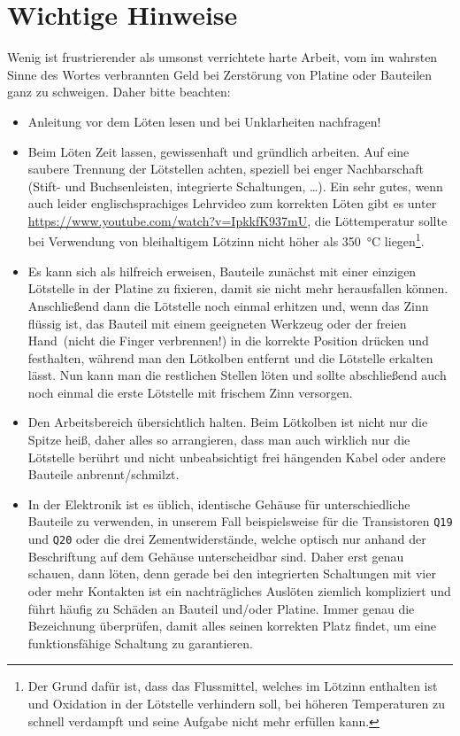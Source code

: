 \documentclass[paper=a4, open=any, numbers=noenddot]{scrbook}
\begin{document}
		\section{Wichtige Hinweise}
			Wenig ist frustrierender als umsonst verrichtete harte Arbeit, vom im wahrsten Sinne des Wortes verbrannten Geld bei Zerstörung von Platine oder Bauteilen ganz zu schweigen. Daher bitte beachten:
			\begin{itemize}
				\item
				      Anleitung vor dem Löten lesen und bei Unklarheiten nachfragen!
				\item
				      Beim Löten Zeit lassen, gewissenhaft und gründlich arbeiten. Auf eine saubere Trennung der Lötstellen achten, speziell bei enger Nachbarschaft (Stift- und Buchsenleisten, integrierte Schaltungen, \dots). Ein sehr gutes, wenn auch leider englischsprachiges Lehrvideo zum korrekten Löten gibt es unter \url{https://www.youtube.com/watch?v=IpkkfK937mU}, die Löttemperatur sollte bei Verwendung von bleihaltigem Lötzinn nicht höher als \SI{350}{\degreeCelsius} liegen\footnote{Der Grund dafür ist, dass das Flussmittel, welches im Lötzinn enthalten ist und Oxidation in der Lötstelle verhindern soll, bei höheren Temperaturen zu schnell verdampft und seine Aufgabe nicht mehr erfüllen kann.}.
				\item
				      Es kann sich als hilfreich erweisen, Bauteile zunächst mit einer einzigen Lötstelle in der Platine zu fixieren, damit sie nicht mehr herausfallen können. Anschließend dann die Lötstelle noch einmal erhitzen und, wenn das Zinn flüssig ist, das Bauteil mit einem geeigneten Werkzeug oder der freien Hand~(nicht die Finger verbrennen!) in die korrekte Position drücken und festhalten, während man den Lötkolben entfernt und die Lötstelle erkalten lässt. Nun kann man die restlichen Stellen löten und sollte abschließend auch noch einmal die erste Lötstelle mit frischem Zinn versorgen.
				\item
				      Den Arbeitsbereich übersichtlich halten. Beim Lötkolben ist nicht nur die Spitze heiß, daher alles so arrangieren, dass man auch wirklich nur die Lötstelle berührt und nicht unbeabsichtigt frei hängenden Kabel oder andere Bauteile anbrennt/schmilzt.
				\item
				      In der Elektronik ist es üblich, identische Gehäuse für unterschiedliche Bauteile zu verwenden, in unserem Fall beispielsweise für die Transistoren \texttt{Q19} und \texttt{Q20} oder die drei Zementwiderstände, welche optisch nur anhand der Beschriftung auf dem Gehäuse unterscheidbar sind. Daher erst genau schauen, dann löten, denn gerade bei den integrierten Schaltungen mit vier oder mehr Kontakten ist ein nachträgliches Auslöten ziemlich kompliziert und führt häufig zu Schäden an Bauteil und/oder Platine. Immer genau die Bezeichnung überprüfen, damit alles seinen korrekten Platz findet, um eine funktionsfähige Schaltung zu garantieren.

\end{itemize}
\end{document}
